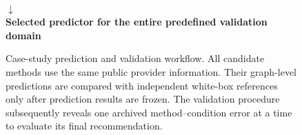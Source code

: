 \begin{figure}[t]
{\begin{minipage}{0.92\linewidth}
{\begin{minipage}{0.81\linewidth}
\end{minipage}}\\[5pt]
$\downarrow$\\[3pt]
\textbf{Selected predictor for the entire predefined validation domain}
\end{minipage}}
\caption{Case-study prediction and validation workflow. All candidate methods use the same public provider information. Their graph-level predictions are compared with independent white-box references only after prediction results are frozen. The validation procedure subsequently reveals one archived method--condition error at a time to evaluate its final recommendation.}
\label{fig:casepipeline}
\end{figure}
